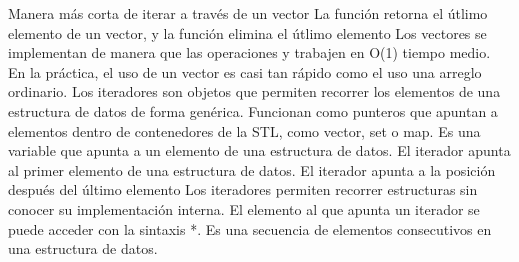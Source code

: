 {}Manera más corta de iterar a través de un vector\markdownRendererInterblockSeparator
{}\markdownRendererInterblockSeparator
{}La función  retorna el útlimo elemento de un vector, y la función  elimina el útlimo elemento\markdownRendererInterblockSeparator
{}\markdownRendererInterblockSeparator
{}Los vectores se implementan de manera que las operaciones  y  trabajen en O(1) tiempo medio.\markdownRendererParagraphSeparator
{}En la práctica, el uso de un vector es casi tan rápido como el uso una arreglo ordinario.\markdownRendererParagraphSeparator
{}
\markdownRendererSectionEnd \markdownRendererSectionBegin
{}\markdownRendererInterblockSeparator
{}Los iteradores son objetos que permiten recorrer los elementos de una estructura de datos de forma genérica.\markdownRendererSoftLineBreak
{}Funcionan como punteros que apuntan a elementos dentro de contenedores de la STL, como vector, set o map.\markdownRendererInterblockSeparator
{}\markdownRendererSectionBegin
{}\markdownRendererInterblockSeparator
{}Es una variable que apunta a un elemento de una estructura de datos.\markdownRendererInterblockSeparator
{}\markdownRendererUlBegin
\markdownRendererUlItem El iterador  apunta al primer elemento de una estructura de datos.\markdownRendererUlItemEnd 
\markdownRendererUlItem El iterador  apunta a la posición después del último elemento\markdownRendererUlItemEnd 
\markdownRendererUlEnd \markdownRendererInterblockSeparator
{}Los iteradores permiten recorrer estructuras sin conocer su implementación interna.\markdownRendererParagraphSeparator
{}El elemento al que apunta un iterador se puede acceder con la sintaxis *.\markdownRendererInterblockSeparator
{}\markdownRendererInterblockSeparator
{}
\markdownRendererSectionEnd \markdownRendererSectionBegin
{}\markdownRendererInterblockSeparator
{}Es una secuencia de elementos consecutivos en una estructura de datos.\markdownRendererParagraphSeparator
